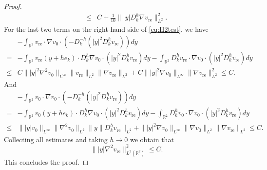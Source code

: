 \documentclass[12pt]{amsart}
\numberwithin{equation}{section}              %
\theoremstyle{remark}
\begin{document}
\begin{proof}
\begin{equation*}
\begin{aligned}
					\leq & C  + \frac{1}{10}\||y| D_k^h \nabla v_{\text{re}}\|_{L^2}^2.
				\end{aligned}
			\end{equation*}
			For the last two terms on the right-hand side of \eqref{eq:H2test}, we have
			\begin{equation*}
				\begin{aligned}
					& -\int_{\mathbb{R}^2} v_{\text{re}} \cdot \nabla v_0 \cdot (-D_k^{-h} (|y|^2 D_k^h v_{\text{re}})) dy \\
					= & -\int_{\mathbb{R}^2} v_{\text{re}}(y + he_k) \cdot D_k^h \nabla v_0 \cdot (|y|^2 D_k^h v_{\text{re}}) dy - \int_{\mathbb{R}^2} D_k^h v_{\text{re}} \cdot \nabla v_0 \cdot (|y|^2 D_k^h v_{\text{re}}) dy \\
					\leq & C\| | y |^2 \nabla^2 v_0 \|_{L^{\infty}}\|v_{\text{re}}\|_{L^2} \|\nabla v_{\text{re}}\|_{L^2} + C\| | y |^2 \nabla v_0 \|_{L^{\infty}}\|\nabla v_{\text{re}}\|_{L^2}^2\leq C.
				\end{aligned}
			\end{equation*}
			And		
			\begin{equation*}
				\begin{aligned}
					& -\int_{\mathbb{R}^2} v_0 \cdot \nabla v_0 \cdot (-D_k^{-h} (|y|^2 D_k^h v_{\text{re}})) dy \\
					= & -\int_{\mathbb{R}^2} v_0(y + he_k) \cdot D_k^h \nabla v_0 \cdot (|y|^2 D_k^h v_{\text{re}}) dy - \int_{\mathbb{R}^2} D_k^h v_0 \cdot \nabla v_0 \cdot (|y|^2 D_k^h v_{\text{re}}) dy \\
					\leq & \| | y | v_0\|_{L^{\infty}} \| \nabla^2 v_0 \|_{L^2} \| y \|D_k^h v_{\text{re}}\|_{L^2} + \| | y |^2 \nabla v_0 \|_{L^{\infty}} \|\nabla v_0\|_{L^2} \|\nabla v_{\text{re}}\|_{L^2}\leq C.
				\end{aligned}
			\end{equation*}
			Collecting all estimates and taking $h \to 0$ we obtain that
			\begin{equation}
				\||y|\nabla^2 v_{\text{re}}\|^2_{L^2(\mathbb{R}^2)} \leq C.
			\end{equation}
			This concludes the proof.
		\end{proof}
		
\end{document}
